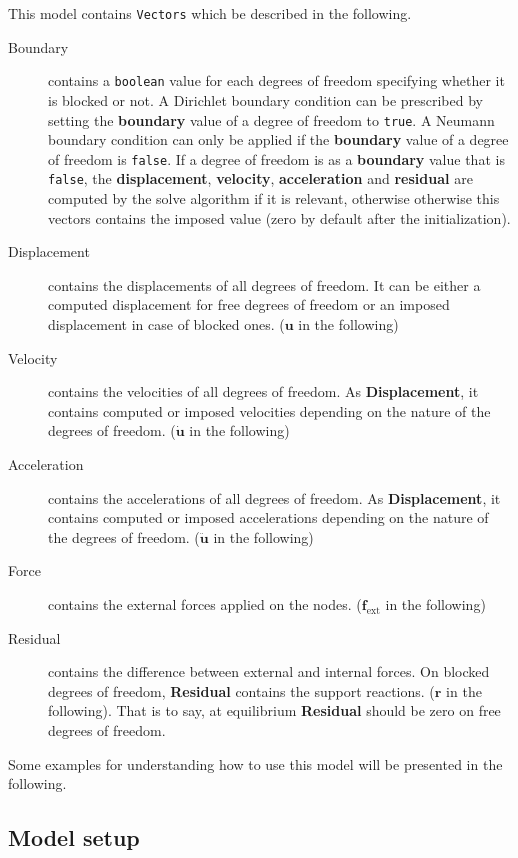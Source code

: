 \documentclass[a4paper,11pt]{book}
\newcommand{\code}[1]{\texttt{#1}}
\renewcommand{\vec}[1]{\ensuremath{\boldsymbol{#1}}}
\newcommand{\st}[1]{{\mathrm{#1}}}
\begin{document}
This model contains \code{Vectors} which be described in the following.
\begin{description}
\item[Boundary]  contains a  \code{boolean} value  for each  degrees  of freedom
  specifying whether it is blocked or not. A Dirichlet boundary condition can be
  prescribed by  setting the \textbf{boundary} value  of a degree  of freedom to
  \code{true}.   A  Neumann  boundary  condition  can only  be  applied  if  the
  \textbf{boundary} value of a degree of freedom is \code{false}. If a degree of
  freedom   is  as  a   \textbf{boundary}  value   that  is   \code{false},  the
  \textbf{displacement},     \textbf{velocity},     \textbf{acceleration}    and
  \textbf{residual}  are computed  by the  solve  algorithm if  it is  relevant,
  otherwise otherwise this  vectors contains the imposed value  (zero by default
  after the initialization).
\item[Displacement] contains the displacements of all degrees of freedom. It can
  be either  a computed displacement for  free degrees of freedom  or an imposed
  displacement in case of blocked ones. ($\vec{u}$ in the following)
\item[Velocity]  contains  the  velocities   of  all  degrees  of  freedom.   As
  \textbf{Displacement}, it contains computed or imposed velocities depending on
  the nature of the degrees of freedom. ($\vec{\dot{u}}$ in the following)
\item[Acceleration]  contains the accelerations  of all  degrees of  freedom. As
  \textbf{Displacement}, it contains computed or imposed accelerations depending
  on the nature of the degrees of freedom. ($\vec{\ddot{u}}$ in the following)
\item[Force]   contains   the   external    forces   applied   on   the   nodes.
  ($\vec{f_{\st{ext}}}$ in the following)
\item[Residual] contains the difference between external and internal forces. On
  blocked degrees of freedom,  \textbf{Residual} contains the support reactions.
  ($\vec{r}$   in   the   following).    That   is  to   say,   at   equilibrium
  \textbf{Residual} should be zero on free degrees of freedom.
\end{description}

Some examples for  understanding how to use this model will  be presented in the
following.

\subsection{Model setup}
\end{document}
